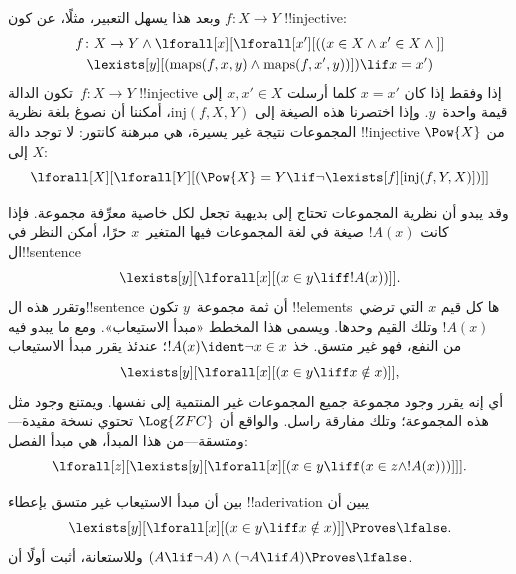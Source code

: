\documentclass[../../../include/open-logic-section]{subfiles}
\begin{document}
وبعد هذا يسهل التعبير، مثلًا، عن كون $f\colon X \to Y$
!!{injective}:
\begin{multline*}
 f \colon X \to Y \land \lforall[x][\lforall[x'][((x \in X \land x' \in
     X \land {}]] \\
 \lexists[y][(\mathrm{maps}(f, x, y) \land \mathrm{maps}(f,
        x', y))]) \lif x = x')
\end{multline*}
تكون الدالة~$f\colon X \to Y$ !!{injective} إذا وفقط إذا كان
$x = x'$ كلما أرسلت $x, x' \in X$ إلى قيمة واحدة~$y$. وإذا اختصرنا
هذه الصيغة إلى $\mathrm{inj}(f, X, Y)$، أمكننا أن نصوغ بلغة نظرية المجموعات نتيجة غير يسيرة، هي مبرهنة كانتور: لا توجد
دالة !!{injective} من $\Pow{X}$ إلى $X$:
\[
\lforall[X][\lforall[Y][(\Pow{X} = Y \lif
    \lnot\lexists[f][\mathrm{inj}(f, Y, X)])]]
\]

وقد يبدو أن نظرية المجموعات تحتاج إلى بديهية تجعل لكل خاصية
معرِّفة مجموعة. فإذا كانت $!A(x)$ صيغة في لغة المجموعات
فيها المتغير~$x$ حرًا، أمكن النظر في ال!!{sentence}
\[
\lexists[y][\lforall[x][(x \in y \liff !A(x))]].
\]
وتقرر هذه ال!!{sentence} أن ثمة مجموعة~$y$ تكون !!{element}sها كل
قيم $x$ التي ترضي~$!A(x)$ وتلك القيم وحدها. ويسمى هذا المخطط «مبدأ
الاستيعاب». ومع ما يبدو فيه من النفع، فهو غير متسق. خذ
$!A(x) \ident \lnot x \in x$؛ عندئذ يقرر مبدأ الاستيعاب
\[
\lexists[y][\lforall[x][(x \in y \liff x \notin x)]],
\]
أي إنه يقرر وجود مجموعة جميع المجموعات غير المنتمية إلى نفسها. ويمتنع
وجود مثل هذه المجموعة؛ وتلك مفارقة راسل. والواقع أن
$\Log{ZFC}$ تحتوي نسخة مقيدة---ومتسقة---من هذا المبدأ، هي مبدأ الفصل:
\[
\lforall[z][\lexists[y][\lforall[x][(x \in y \liff (x \in z \land
      !A(x)))]]].
\]

\begin{prob}
بين أن مبدأ الاستيعاب غير متسق بإعطاء !!a{derivation} يبين أن
\[
\lexists[y][\lforall[x][(x \in y \liff x \notin x)]] \Proves \lfalse.
\]
وللاستعانة، أثبت أولًا أن $(A \lif \lnot A) \land (\lnot A \lif A)
\Proves \lfalse$.
\end{prob}
\end{document}
